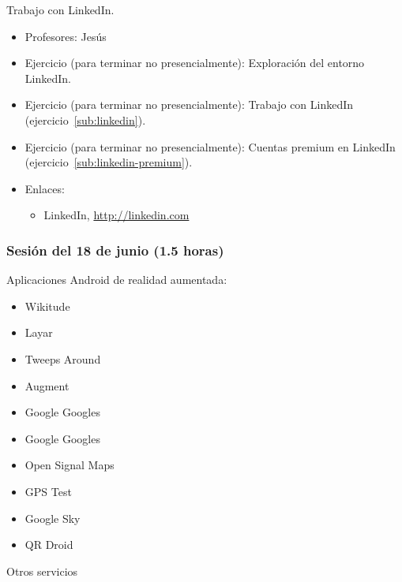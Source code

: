 \documentclass[a4paper,12pt]{article}
\begin{document}
Trabajo con LinkedIn.

\begin{itemize}
\item Profesores: Jesús
\item Ejercicio (para terminar no presencialmente): Exploración del entorno LinkedIn.
\item Ejercicio (para terminar no presencialmente): Trabajo con LinkedIn (ejercicio~\ref{sub:linkedin}).
\item Ejercicio (para terminar no presencialmente): Cuentas premium en LinkedIn (ejercicio~\ref{sub:linkedin-premium}).
\item Enlaces:
  \begin{itemize}
  \item LinkedIn, \url{http://linkedin.com}
  \end{itemize}
\end{itemize}

\subsubsection{Sesión del 18 de junio (1.5 horas)}

Aplicaciones Android de realidad aumentada:

\begin{itemize}
\item Wikitude
\item Layar
\item Tweeps Around
\item Augment
\item Google Googles
\item Google Googles
\item Open Signal Maps
\item GPS Test
\item Google Sky
\item QR Droid
\end{itemize}

Otros servicios

\end{document}
